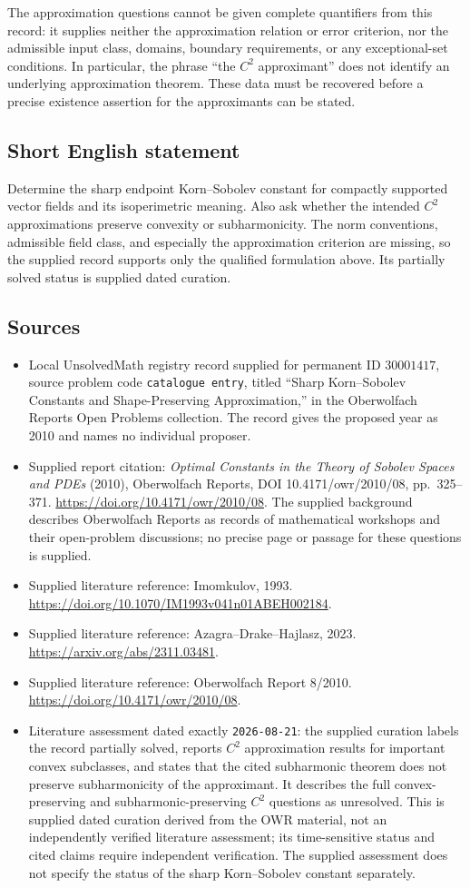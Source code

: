 \documentclass[11pt]{article}
\begin{document}
The approximation questions cannot be given complete quantifiers from this record: it supplies neither the approximation relation or error criterion, nor the admissible input class, domains, boundary requirements, or any exceptional-set conditions. In particular, the phrase ``the \(C^2\) approximant'' does not identify an underlying approximation theorem. These data must be recovered before a precise existence assertion for the approximants can be stated.
\subsection{Short English statement}
Determine the sharp endpoint Korn--Sobolev constant for compactly supported vector fields and its isoperimetric meaning. Also ask whether the intended \(C^2\) approximations preserve convexity or subharmonicity. The norm conventions, admissible field class, and especially the approximation criterion are missing, so the supplied record supports only the qualified formulation above. Its partially solved status is supplied dated curation.
\subsection{Sources}
\begin{itemize}
\item Local UnsolvedMath registry record supplied for permanent ID \(30001417\), source problem code \texttt{catalogue entry}, titled ``Sharp Korn--Sobolev Constants and Shape-Preserving Approximation,'' in the Oberwolfach Reports Open Problems collection. The record gives the proposed year as 2010 and names no individual proposer.
\item Supplied report citation: \emph{Optimal Constants in the Theory of Sobolev Spaces and PDEs} (2010), Oberwolfach Reports, DOI 10.4171/owr/2010/08, pp.~325--371. \url{https://doi.org/10.4171/owr/2010/08}. The supplied background describes Oberwolfach Reports as records of mathematical workshops and their open-problem discussions; no precise page or passage for these questions is supplied.
\item Supplied literature reference: Imomkulov, 1993. \url{https://doi.org/10.1070/IM1993v041n01ABEH002184}.
\item Supplied literature reference: Azagra--Drake--Hajlasz, 2023. \url{https://arxiv.org/abs/2311.03481}.
\item Supplied literature reference: Oberwolfach Report 8/2010. \url{https://doi.org/10.4171/owr/2010/08}.
\item Literature assessment dated exactly \texttt{2026-08-21}: the supplied curation labels the record partially solved, reports \(C^2\) approximation results for important convex subclasses, and states that the cited subharmonic theorem does not preserve subharmonicity of the approximant. It describes the full convex-preserving and subharmonic-preserving \(C^2\) questions as unresolved. This is supplied dated curation derived from the OWR material, not an independently verified literature assessment; its time-sensitive status and cited claims require independent verification. The supplied assessment does not specify the status of the sharp Korn--Sobolev constant separately.
\end{itemize}
\end{document}
